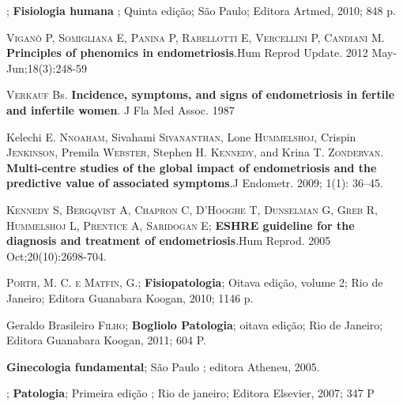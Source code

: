 \documentclass[12pt]{article} %
\begin{document}
;\textbf{ Fisiologia humana} ; Quinta edição; São Paulo; Editora Artmed, 2010; 848 p.

\vspace{0,5cm}

\textsc{Viganò P, Somigliana E, Panina P, Rabellotti E, Vercellini P, Candiani M}. \textbf{Principles of phenomics in endometriosis}.Hum Reprod Update. 2012 May-Jun;18(3):248-59

\vspace{0,5cm}

\textsc{Verkauf} Bs. \textbf{ Incidence, symptoms, and signs of endometriosis in fertile and infertile women}. J Fla Med Assoc. 1987

\vspace{0,5cm}

Kelechi E.\textsc{ Nnoaham}, Sivahami \textsc{Sivananthan}, Lone \textsc{Hummelshoj}, Crispin \textsc{Jenkinson}, Premila\textsc{ Webster}, Stephen H. \textsc{Kennedy}, and Krina T. \textsc{Zondervan}.\textbf{ Multi-centre studies of the global impact of endometriosis and the predictive value of associated symptoms}.J Endometr. 2009; 1(1): 36–45. 

\vspace{0,5cm}

\textsc{Kennedy S, Bergqvist A, Chapron C, D'Hooghe T, Dunselman G, Greb R, Hummelshoj L, Prentice A, Saridogan E}; \textbf{ESHRE guideline for the diagnosis and treatment of endometriosis}.Hum Reprod. 2005 Oct;20(10):2698-704. 

\vspace{0,5cm}

\textsc{Porth, M. C. e Matfin, G}.;\textbf{ Fisiopatologia}; Oitava edição, volume 2; Rio de
Janeiro; Editora Guanabara Koogan, 2010; 1146 p.

\vspace{0,5cm}

Geraldo Brasileiro\textsc{ Filho}; \textbf{Bogliolo Patologia}; oitava edição; Rio de Janeiro; Editora Guanabara Koogan, 2011; 604 P.

\vspace{0,5cm}

 \textbf{Ginecologia fundamental}; São Paulo ; editora  Atheneu, 2005.

\vspace{0,5cm}
	

;\textbf{ Patologia}; Primeira edição ; Rio de
janeiro; Editora Elsevier, 2007; 347 P
\end{document}
